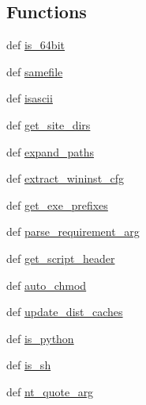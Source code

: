 \subsection*{Functions}
\begin{DoxyCompactItemize}
\item 
def \hyperlink{namespacesetuptools_1_1command_1_1easy__install_a1a3cf99958edbe92e613824dda738e8b}{is\+\_\+64bit}
\item 
def \hyperlink{namespacesetuptools_1_1command_1_1easy__install_adae30551ced59f4ba5726b6e2524092a}{samefile}
\item 
def \hyperlink{namespacesetuptools_1_1command_1_1easy__install_a08d583842330ee90f8dc546f001fe533}{isascii}
\item 
def \hyperlink{namespacesetuptools_1_1command_1_1easy__install_a007b1a8e4d474a7bd8787500ba183dea}{get\+\_\+site\+\_\+dirs}
\item 
def \hyperlink{namespacesetuptools_1_1command_1_1easy__install_a3f27f63e680da718795accd4f172329a}{expand\+\_\+paths}
\item 
def \hyperlink{namespacesetuptools_1_1command_1_1easy__install_afe382d96d9fdfdd7a000ea73187b6ba9}{extract\+\_\+wininst\+\_\+cfg}
\item 
def \hyperlink{namespacesetuptools_1_1command_1_1easy__install_a5575a2fbcead65409c90d61734d19f8a}{get\+\_\+exe\+\_\+prefixes}
\item 
def \hyperlink{namespacesetuptools_1_1command_1_1easy__install_a485973c15e8eeba16cf124c921a10c8b}{parse\+\_\+requirement\+\_\+arg}
\item 
def \hyperlink{namespacesetuptools_1_1command_1_1easy__install_aa8f7b4a6293dbbdc35c180dc539ccbc0}{get\+\_\+script\+\_\+header}
\item 
def \hyperlink{namespacesetuptools_1_1command_1_1easy__install_acadb86504b34bc06dac4aa39bd4f76dc}{auto\+\_\+chmod}
\item 
def \hyperlink{namespacesetuptools_1_1command_1_1easy__install_a9ee1e9c45d37dc25feffbd321e77bafe}{update\+\_\+dist\+\_\+caches}
\item 
def \hyperlink{namespacesetuptools_1_1command_1_1easy__install_a8fa458e1285234f46356ff281a81b57f}{is\+\_\+python}
\item 
def \hyperlink{namespacesetuptools_1_1command_1_1easy__install_a5ac3d0a7727680183c05d5636d86dc71}{is\+\_\+sh}
\item 
def \hyperlink{namespacesetuptools_1_1command_1_1easy__install_a8fd2fdd8415c211d9f09f175421bc950}{nt\+\_\+quote\+\_\+arg}
\item 

\end{DoxyCompactItemize}
